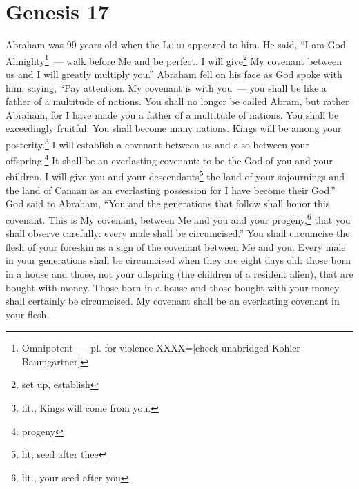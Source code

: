 \section{Genesis 17}\label{Genesis 17}
\begin{enumerate}[align=center]
     Abraham was 99 years old when the \textsc{Lord} appeared to him. He said, ``I am God Almighty\footnote{Omnipotent~--- pl. for violence XXXX=[check unabridged Kohler-Baumgartner]}~--- walk before Me and be perfect.%
     I will give\footnote{set up, establish} My covenant between us and I will greatly multiply you.''%
     Abraham fell on his face as God spoke with him, saying,%
     ``Pay attention. My covenant is with you~--- you shall be like a father of a multitude of nations.%
     You shall no longer be called Abram, but rather Abraham, for I have made you a father of a multitude of nations.%
     You shall be exceedingly fruitful. You shall become many nations. Kings will be among your posterity.\footnote{lit., Kings will come from you.}%
     I will establish a covenant between us and also between your offspring.\footnote{progeny} It shall be an everlasting covenant: to be the God of you and your children.%
     I will give you and your descendants\footnote{lit, seed after thee} the land of your sojournings and the land of Canaan as an everlasting possession for I have become their God.''%
     God said to Abraham, ``You and the generations that follow shall honor this covenant.%
     This is My covenant, between Me and you and your progeny,\footnote{lit., your seed after you} that you shall observe carefully: every male shall be circumcised.''%
     You shall circumcise the flesh of your foreskin as a sign of the covenant between Me and you.%
     Every male in your generations shall be circumcised when they are eight days old: those born in a house and those, not your offspring (the children of a resident alien), that are bought with money.%
     Those born in a house and those bought with your money shall certainly be circumcised. My covenant shall be an everlasting covenant in your flesh.%

\end{enumerate}
